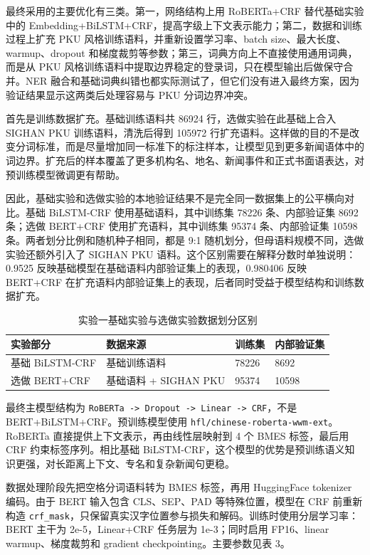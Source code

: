 \documentclass[12pt,a4paper,UTF8]{ctexart}
\newcommand{\xiaosi}{\fontsize{12pt}{18pt}\selectfont}
\newenvironment{reportbody}{\songti\xiaosi\onehalfspacing\sloppy}{}
\begin{document}
\begin{reportbody}
最终采用的主要优化有三类。第一，网络结构上用 RoBERTa+CRF 替代基础实验中的 Embedding+BiLSTM+CRF，提高字级上下文表示能力；第二，数据和训练过程上扩充 PKU 风格训练语料，并重新设置学习率、batch size、最大长度、warmup、dropout 和梯度裁剪等参数；第三，词典方向上不直接使用通用词典，而是从 PKU 风格训练语料中提取边界稳定的登录词，只在模型输出后做保守合并。NER 融合和基础词典纠错也都实际测试了，但它们没有进入最终方案，因为验证结果显示这两类后处理容易与 PKU 分词边界冲突。

首先是训练数据扩充。基础训练语料共 86924 行，选做实验在此基础上合入 SIGHAN PKU 训练语料，清洗后得到 105972 行扩充语料。这样做的目的不是改变分词标准，而是尽量增加同一标准下的标注样本，让模型见到更多新闻语体中的词边界。扩充后的样本覆盖了更多机构名、地名、新闻事件和正式书面语表达，对预训练模型微调更有帮助。

因此，基础实验和选做实验的本地验证结果不是完全同一数据集上的公平横向对比。基础 BiLSTM-CRF 使用基础语料，其中训练集 78226 条、内部验证集 8692 条；选做 BERT+CRF 使用扩充语料，其中训练集 95374 条、内部验证集 10598 条。两者划分比例和随机种子相同，都是 9:1 随机划分，但母语料规模不同，选做实验还额外引入了 SIGHAN PKU 语料。这个区别需要在解释分数时单独说明：0.9525 反映基础模型在基础语料内部验证集上的表现，0.980406 反映 BERT+CRF 在扩充语料内部验证集上的表现，后者同时受益于模型结构和训练数据扩充。

\begin{table}[htbp]
  \caption{实验一基础实验与选做实验数据划分区别}
  \centering
  \begin{tabular}{C{30mm}C{43mm}C{25mm}C{25mm}}
    \toprule
    实验部分 & 数据来源 & 训练集 & 内部验证集 \\
    \midrule
    基础 BiLSTM-CRF & 基础训练语料 & 78226 & 8692 \\
    选做 BERT+CRF & 基础语料 + SIGHAN PKU & 95374 & 10598 \\
    \bottomrule
  \end{tabular}
\end{table}

最终主模型结构为 \texttt{RoBERTa -> Dropout -> Linear -> CRF}，不是 BERT+BiLSTM+CRF。预训练模型使用 \texttt{hfl/chinese-roberta-wwm-ext}。RoBERTa 直接提供上下文表示，再由线性层映射到 4 个 BMES 标签，最后用 CRF 约束标签序列。相比基础 BiLSTM-CRF，这个模型的优势是预训练语义知识更强，对长距离上下文、专名和复杂新闻句更稳。

数据处理阶段先把空格分词语料转为 BMES 标签，再用 HuggingFace tokenizer 编码。由于 BERT 输入包含 CLS、SEP、PAD 等特殊位置，模型在 CRF 前重新构造 \texttt{crf\_mask}，只保留真实汉字位置参与损失和解码。训练时使用分层学习率：BERT 主干为 2e-5，Linear+CRF 任务层为 1e-3；同时启用 FP16、linear warmup、梯度裁剪和 gradient checkpointing。主要参数见表 3。


\end{reportbody}
\end{document}
